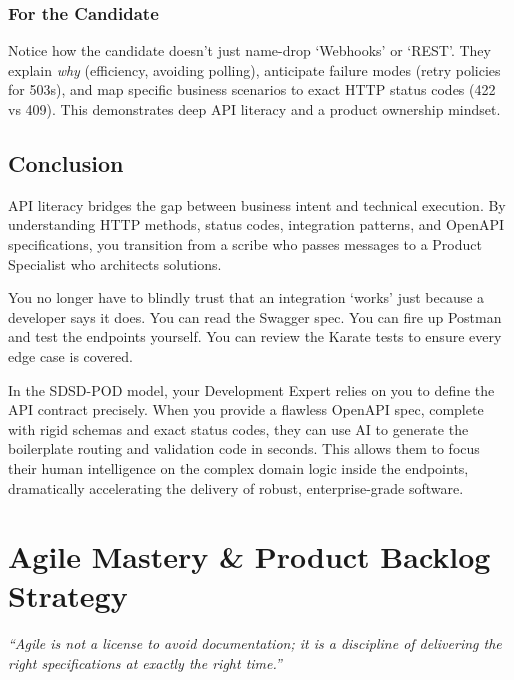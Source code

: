 \documentclass[
  11pt,
  openany,
  oneside]{book}
\renewenvironment{quote}{\begin{customquote}}{\end{customquote}}
\begin{document}
\begin{quote}
\subsection{For the Candidate}\label{for-the-candidate-1}

Notice how the candidate doesn't just name-drop `Webhooks' or `REST'.
They explain \emph{why} (efficiency, avoiding polling), anticipate
failure modes (retry policies for 503s), and map specific business
scenarios to exact HTTP status codes (422 vs 409). This demonstrates
deep API literacy and a product ownership mindset.
\end{quote}

\section{Conclusion}\label{conclusion-3}

API literacy bridges the gap between business intent and technical
execution. By understanding HTTP methods, status codes, integration
patterns, and OpenAPI specifications, you transition from a scribe who
passes messages to a Product Specialist who architects solutions.

You no longer have to blindly trust that an integration `works' just
because a developer says it does. You can read the Swagger spec. You can
fire up Postman and test the endpoints yourself. You can review the
Karate tests to ensure every edge case is covered.

In the SDSD-POD model, your Development Expert relies on you to define
the API contract precisely. When you provide a flawless OpenAPI spec,
complete with rigid schemas and exact status codes, they can use AI to
generate the boilerplate routing and validation code in seconds. This
allows them to focus their human intelligence on the complex domain
logic inside the endpoints, dramatically accelerating the delivery of
robust, enterprise-grade software.

\chapter{Agile Mastery \& Product Backlog
Strategy}\label{agile-mastery-product-backlog-strategy}

\begin{quote}
\emph{``Agile is not a license to avoid documentation; it is a
discipline of delivering the right specifications at exactly the right
time.''}
\end{quote}
\end{document}
